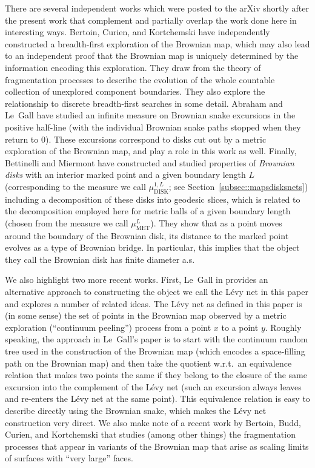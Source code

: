 \documentclass[10pt]{amsart}
\theoremstyle{plain}
\numberwithin{theorem}{section}
\theoremstyle{definition}
\newcommand{\mudonel}{\mu_{ \mathrm{DISK}}^{1, L}}
\newcommand{\muml}{\mu_{\mathrm{MET}}^L}
\begin{document}
There are several independent works which were posted to the arXiv shortly after the present work that complement and partially overlap the work done here in interesting ways. Bertoin, Curien, and Kortchemski \cite{bck} have independently constructed a breadth-first exploration of the Brownian map, which may also lead to an independent proof that the Brownian map is uniquely determined by the information encoding this exploration. They draw from the theory of fragmentation processes to describe the evolution of the whole countable collection of unexplored component boundaries. They also explore the relationship to discrete breadth-first searches in some detail. Abraham and Le~Gall \cite{alg} have studied an infinite measure on Brownian snake excursions in the positive half-line (with the individual Brownian snake paths stopped when they return to $0$). These excursions correspond to disks cut out by a metric exploration of the Brownian map, and play a role in this work as well. Finally, Bettinelli and Miermont \cite{bettinelli_miermont_disks} have constructed and studied properties of \emph{Brownian disks} with an interior marked point and a given boundary length $L$ (corresponding to the measure we call $\mudonel$; see Section~\ref{subsec::mapsdisksnets}) including a decomposition of these disks into geodesic slices, which is related to the decomposition employed here for metric balls of a given boundary length (chosen from the measure we call $\muml$). They show that as a point moves around the boundary of the Brownian disk, its distance to the marked point evolves as a type of Brownian bridge. In particular, this implies that the object they call the Brownian disk has finite diameter a.s.

We also highlight two more recent works. First, Le~Gall in \cite{legallsubordination} provides an alternative approach to constructing the object we call the Lévy net in this paper and explores a number of related ideas. The Lévy net as defined in this paper is (in some sense) the set of points in the Brownian map observed by a metric exploration (``continuum peeling'') process from a point $x$ to a point $y$. Roughly speaking, the approach in Le~Gall's paper is to start with the continuum random tree used in the construction of the Brownian map (which encodes a space-filling path on the Brownian map) and then take the quotient w.r.t.\ an equivalence relation that makes two points the same if they belong to the closure of the same excursion into the complement of the Lévy net (such an excursion always leaves and re-enters the Lévy net at the same point). This equivalence relation is easy to describe directly using the Brownian snake, which makes the Lévy net construction very direct. We also make note of a recent work by Bertoin, Budd, Curien, and Kortchemski \cite{betroinbuddcurienkortchemski} that studies (among other things) the fragmentation processes that appear in variants of the Brownian map that arise as scaling limits of surfaces with ``very large'' faces.
\end{document}
